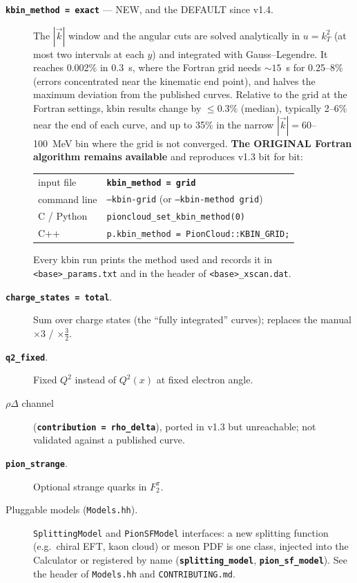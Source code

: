 \documentclass[11pt,a4paper]{article}
\newcommand{\code}[1]{\texttt{#1}}
\newcommand{\inikey}[1]{\texttt{\textbf{#1}}}
\begin{document}
\begin{description}
\item[\inikey{kbin\_method = exact} --- NEW, and the DEFAULT since v1.4.]
  The $|\vec k|$ window and the angular cuts are solved analytically in
  $u=k_T^2$ (at most two intervals at each $y$) and integrated with
  Gauss--Legendre.  It reaches 0.002\% in 0.3~s, where the Fortran grid needs
  $\sim15$~s for 0.25--8\% (errors concentrated near the kinematic end point),
  and halves the maximum deviation from the published curves.  Relative to
  the grid at the Fortran settings, kbin results change by $\le0.3\%$
  (median), typically 2--6\% near the end of each curve, and up to 35\% in
  the narrow $|\vec k|=60$--100~MeV bin where the grid is not converged.
  \textbf{The ORIGINAL Fortran algorithm remains available} and reproduces
  v1.3 bit for bit:
  \begin{center}
  \begin{tabular}{ll}
  input file & \inikey{kbin\_method = grid} \\
  command line & \texttt{--kbin-grid} \quad(or \texttt{--kbin-method grid}) \\
  C / Python & \texttt{pioncloud\_set\_kbin\_method(0)} \\
  C++ & \code{p.kbin\_method = PionCloud::KBIN\_GRID;}
  \end{tabular}
  \end{center}
  Every kbin run prints the method used and records it in
  \texttt{<base>\_params.txt} and in the header of \texttt{<base>\_xscan.dat}.
\item[\inikey{charge\_states = total}.] Sum over charge states (the
  ``fully integrated'' curves); replaces the manual $\times3$ / $\times\tfrac32$.
\item[\inikey{q2\_fixed}.] Fixed $Q^2$ instead of $Q^2(x)$ at fixed electron angle.
\item[$\rho\Delta$ channel] (\inikey{contribution = rho\_delta}), ported
  in v1.3 but unreachable; not validated against a published curve.
\item[\inikey{pion\_strange}.] Optional strange quarks in $F_2^\pi$.
\item[Pluggable models (\texttt{Models.hh}).] \code{SplittingModel} and
  \code{PionSFModel} interfaces: a new splitting function (e.g.\ chiral EFT,
  kaon cloud) or meson PDF is one class, injected into the Calculator or
  registered by name (\inikey{splitting\_model}, \inikey{pion\_sf\_model}).
  See the header of \texttt{Models.hh} and \texttt{CONTRIBUTING.md}.
\end{description}
\end{document}
